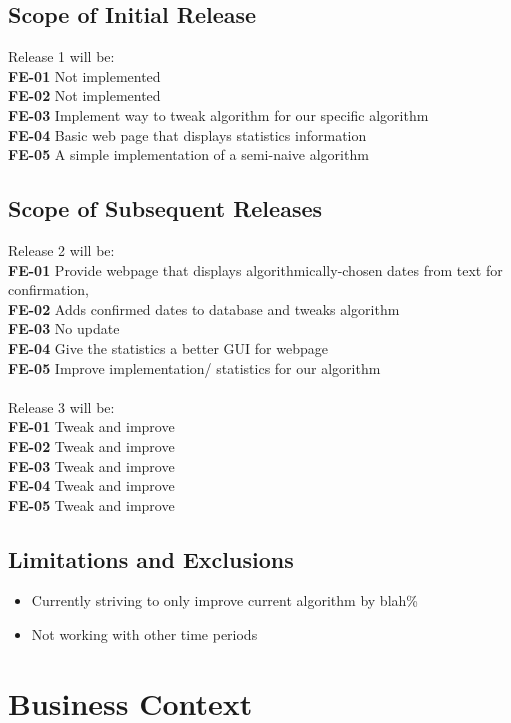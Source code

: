 \documentclass[11pt]{article}
\begin{document}
\subsection{Scope of Initial Release}
Release 1 will be: \\
\textbf{FE-01} Not implemented \\
\textbf{FE-02} Not implemented \\
\textbf{FE-03} Implement way to tweak algorithm for our specific algorithm \\
\textbf{FE-04} Basic web page that displays statistics information \\
\textbf{FE-05} A simple implementation of a semi-naive algorithm

\subsection{Scope of Subsequent Releases}
Release 2 will be: \\
\textbf{FE-01} Provide webpage that displays algorithmically-chosen dates from text for confirmation, \\
\textbf{FE-02} Adds confirmed dates to database and tweaks algorithm \\
\textbf{FE-03} No update \\
\textbf{FE-04} Give the statistics a better GUI for webpage \\
\textbf{FE-05} Improve implementation/ statistics for our algorithm \\
 \\
Release 3 will be: \\
\textbf{FE-01} Tweak and improve \\
\textbf{FE-02} Tweak and improve \\
\textbf{FE-03} Tweak and improve \\
\textbf{FE-04} Tweak and improve \\
\textbf{FE-05} Tweak and improve

\subsection{Limitations and Exclusions}
\begin{itemize}
    \item Currently striving to only improve current algorithm by blah\%
    \item Not working with other time periods
\end{itemize}

\section{Business Context}
\end{document}
